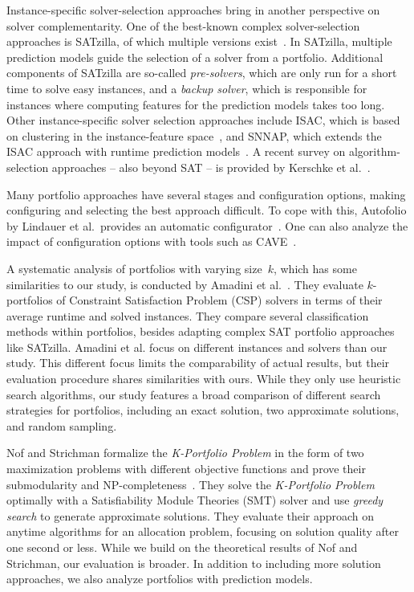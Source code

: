\documentclass[a4paper,USenglish,pdfa]{lipics-v2021} %
\begin{document}
Instance-specific solver-selection approaches bring in another perspective on solver complementarity.
One of the best-known complex solver-selection approaches is SATzilla, of which multiple versions exist~\cite{xu2008satzilla,xu2012satzilla2012}. 
In SATzilla, multiple prediction models guide the selection of a solver from a portfolio. 
Additional components of SATzilla are so-called \emph{pre-solvers}, which are only run for a short time to solve easy instances, and a \emph{backup solver}, which is responsible for instances where computing features for the prediction models takes too long.
Other instance-specific solver selection approaches include ISAC, which is based on clustering in the instance-feature space~\cite{Kadioglu:2010:ISAC}, and SNNAP, which extends the ISAC approach with runtime prediction models~\cite{Collautti:2013:SNNAP}.
A recent survey on algorithm-selection approaches -- also beyond SAT -- is provided by Kerschke et al.~\cite{kerschke2019automated}.

Many portfolio approaches have several stages and configuration options, making configuring and selecting the best approach difficult.
To cope with this, Autofolio by Lindauer et al.\ provides an automatic configurator~\cite{lindauer2015autofolio}.
One can also analyze the impact of configuration options with tools such as CAVE~\cite{biedenkapp2018cave}.

A systematic analysis of portfolios with varying size~$k$, which has some similarities to our study, is conducted by Amadini et al.~\cite{amadini2014empirical,amadini2016extensive}.
They evaluate $k$-portfolios of Constraint Satisfaction Problem (CSP) solvers in terms of their average runtime and solved instances. 
They compare several classification methods within portfolios, besides adapting complex SAT portfolio approaches like SATzilla. 
Amadini et al. focus on different instances and solvers than our study.
This different focus limits the comparability of actual results, but their evaluation procedure shares similarities with ours.
While they only use heuristic search algorithms, our study features a broad comparison of different search strategies for portfolios, including an exact solution, two approximate solutions, and random sampling. 

Nof and Strichman formalize the \emph{K-Portfolio Problem} in the form of two maximization problems with different objective functions and prove their submodularity and NP-completeness~\cite{nof2020real}. 
They solve the \emph{K-Portfolio Problem} optimally with a Satisfiability Module Theories (SMT) solver and use \emph{greedy search} to generate approximate solutions.
They evaluate their approach on anytime algorithms for an allocation problem, focusing on solution quality after one second or less. 
While we build on the theoretical results of Nof and Strichman, our evaluation is broader. 
In addition to including more solution approaches, we also analyze portfolios with prediction models.
\end{document}
